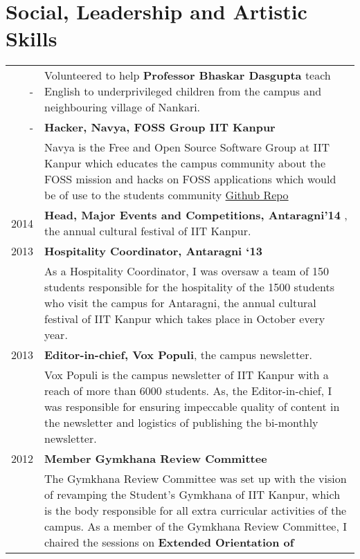 \documentclass[a4paper,10pt]{article} %
\begin{document}

\section {Social, Leadership and Artistic Skills}
\begin{tabular}{rp{12cm}}

    -    & Volunteered to help \textbf{Professor Bhaskar Dasgupta} teach English to underprivileged children from the campus
           and neighbouring village of Nankari.\\
    -    & \textbf{Hacker, Navya, FOSS Group IIT Kanpur}\\
         & \footnotesize{Navya is the Free and Open Source Software Group at IIT
           Kanpur which educates the campus community about the FOSS mission and
           hacks on FOSS applications which would be of use to the students
           community \href{https://github.com/navya} {Github Repo}} \\
    2014 & \textbf{Head, Major Events and Competitions, Antaragni'14} , the annual cultural festival of
    IIT Kanpur. \\
    2013 & \textbf{Hospitality Coordinator, Antaragni ‘13}\\
         & \footnotesize{As a Hospitality Coordinator, I was oversaw a team of 150 students responsible for
            the hospitality of the 1500 students who visit the campus for Antaragni, the annual cultural festival
            of IIT Kanpur which takes place in October every year.}\\
    2013 & \textbf{Editor-in-chief, Vox Populi}, the campus newsletter. \\
         & \footnotesize{Vox Populi is the campus newsletter of IIT Kanpur with a reach of more than 6000 students.
            As, the Editor-in-chief, I was responsible for ensuring impeccable quality of content in the newsletter and
            logistics of publishing the bi-monthly newsletter.}\\
    2012 & \textbf{Member Gymkhana Review Committee}\\
         & \footnotesize{The Gymkhana Review Committee was set up with the vision of revamping the Student's Gymkhana
            of IIT Kanpur, which is the body responsible for all extra curricular activities of the campus. As a
            member of the Gymkhana Review Committee, I chaired the sessions on \textbf{Extended Orientation of
}}
\end{tabular}
\end{document}
